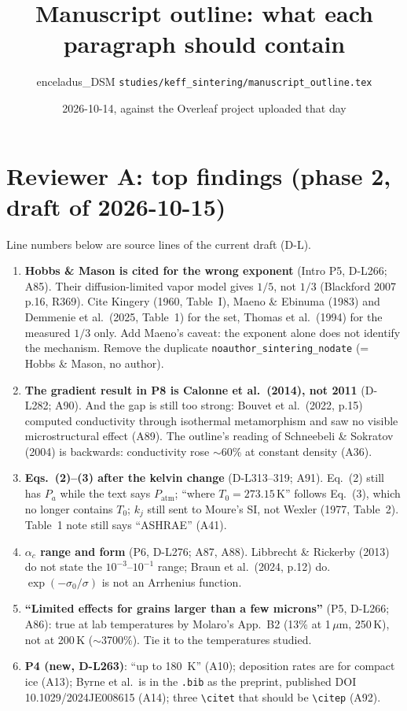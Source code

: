 \documentclass[11pt]{article}
\title{Manuscript outline: what each paragraph should contain}
\author{enceladus\_DSM \quad \texttt{studies/keff\_sintering/manuscript\_outline.tex}}
\date{2026-10-14, against the Overleaf project uploaded that day}
\newcommand{\add}[1]{\textcolor{revA}{#1}}
\begin{document}
\maketitle

\section*{\add{Reviewer A: top findings (phase 2, draft of 2026-10-15)}}
\add{Line numbers below are source lines of the current draft (D-L).}
\begin{enumerate}
\item \add{\textbf{Hobbs \& Mason is cited for the wrong exponent} (Intro P5, D-L266; A85). Their diffusion-limited vapor model gives $1/5$, not $1/3$ (Blackford 2007 p.16, R369). Cite Kingery (1960, Table~I), Maeno \& Ebinuma (1983) and Demmenie et al.\ (2025, Table~1) for the set, Thomas et al.\ (1994) for the measured $1/3$ only. Add Maeno's caveat: the exponent alone does not identify the mechanism. Remove the duplicate \texttt{noauthor\_sintering\_nodate} (= Hobbs \& Mason, no author).}
\item \add{\textbf{The gradient result in P8 is Calonne et al.\ (2014), not 2011} (D-L282; A90). And the gap is still too strong: Bouvet et al.\ (2022, p.15) computed conductivity through isothermal metamorphism and saw no visible microstructural effect (A89). The outline's reading of Schneebeli \& Sokratov (2004) is backwards: conductivity rose $\sim$60\% at constant density (A36).}
\item \add{\textbf{Eqs.~(2)--(3) after the kelvin change} (D-L313--319; A91). Eq.~(2) still has $P_a$ while the text says $P_{\mathrm{atm}}$; ``where $T_0 = 273.15$\,K'' follows Eq.~(3), which no longer contains $T_0$; $k_j$ still sent to Moure's SI, not Wexler (1977, Table~2). Table~1 note still says ``ASHRAE'' (A41).}
\item \add{\textbf{$\alpha_c$ range and form} (P6, D-L276; A87, A88). Libbrecht \& Rickerby (2013) do not state the $10^{-3}$--$10^{-1}$ range; Braun et al.\ (2024, p.12) do. $\exp(-\sigma_0/\sigma)$ is not an Arrhenius function.}
\item \add{\textbf{``Limited effects for grains larger than a few microns''} (P5, D-L266; A86): true at lab temperatures by Molaro's App.~B2 (13\% at 1\,$\mu$m, 250\,K), not at 200\,K ($\sim$3700\%). Tie it to the temperatures studied.}
\item \add{\textbf{P4 (new, D-L263)}: ``up to 180~K'' (A10); deposition rates are for compact ice (A13); Byrne et al.\ is in the \texttt{.bib} as the preprint, published DOI 10.1029/2024JE008615 (A14); three \texttt{\textbackslash citet} that should be \texttt{\textbackslash citep} (A92).}

\end{enumerate}
\end{document}
